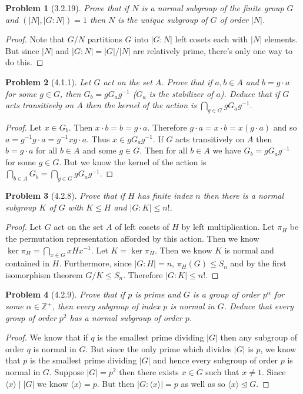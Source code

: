\documentclass{article}
\newtheorem{problem}{Problem}
\newcommand{\normal}{\unlhd}
\begin{document}
\begin{problem}[3.2.19]
Prove that if $N$ is a normal subgroup of the finite group $G$ and $(|N|, |G : N|) = 1$ then $N$ is the unique subgroup of $G$ of order $|N|$.
\end{problem}
\begin{proof}
Note that $G/N$ partitions $G$ into $|G : N|$ left cosets each with $|N|$ elements. But since $|N|$ and $|G : N| = |G|/|N|$ are relatively prime, there's only one way to do this.
\end{proof}

\begin{problem}[4.1.1]
Let $G$ act on the set $A$. Prove that if $a,b \in A$ and $b = g \cdot a$ for some $g \in G$, then $G_b = gG_ag^{-1}$ ($G_a$ is the stabilizer of $a$). Deduce that if $G$ acts transitively on $A$ then the kernel of the action is $\bigcap_{g \in G} gG_ag^{-1}$.
\end{problem}
\begin{proof}
Let $x \in G_b$. Then $x \cdot b = b = g \cdot a$. Therefore $g \cdot a = x \cdot b = x (g \cdot a)$ and so $a = g^{-1}g \cdot a = g^{-1}xg \cdot a$. Thus $x \in gG_ag^{-1}$. If $G$ acts transitively on $A$ then $b = g \cdot a$ for all $b \in A$ and some $g \in G$. Then for all $b \in A$ we have $G_b = gG_ag^{-1}$ for some $g \in G$. But we know the kernel of the action is $\bigcap_{b \in A} G_b = \bigcap_{g \in G} gG_ag^{-1}$.
\end{proof}

\begin{problem}[4.2.8]
Prove that if $H$ has finite index $n$ then there is a normal subgroup $K$ of $G$ with $K \leq H$ and $|G : K| \leq n!$.
\end{problem}
\begin{proof}
Let $G$ act on the set $A$ of left cosets of $H$ by left multiplication. Let $\pi_H$ be the permutation representation afforded by this action. Then we know $\ker \pi_H = \bigcap_{x \in G} xHx^{-1}$. Let $K = \ker \pi_H$. Then we know $K$ is normal and contained in $H$. Furthermore, since $|G : H| = n$, $\pi_H(G) \leq S_n$ and by the first isomorphism theorem $G/K \leq S_n$. Therefore $|G : K| \leq n!$.
\end{proof}

\begin{problem}[4.2.9]
Prove that if $p$ is prime and $G$ is a group of order $p^{\alpha}$ for some $\alpha \in \mathbb{Z}^+$, then every subgroup of index $p$ is normal in $G$. Deduce that every group of order $p^2$ has a normal subgroup of order $p$.
\end{problem}
\begin{proof}
We know that if $q$ is the smallest prime dividing $|G|$ then any subgroup of order $q$ is normal in $G$. But since the only prime which divides $|G|$ is $p$, we know that $p$ is the smallest prime dividing $|G|$ and hence every subgroup of order $p$ is normal in $G$. Suppose $|G| = p^2$ then there exists $x \in G$ such that $x \neq 1$. Since $\langle x \rangle \mid |G|$ we know $\langle x \rangle = p$. But then $|G : \langle x \rangle | = p$ as well as so $\langle x \rangle \normal G$.
\end{proof}
\end{document}
